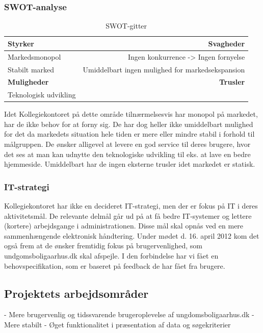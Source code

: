 \documentclass[12pt, a4paper]{report}
\begin{document}
\subsubsection{SWOT-analyse}
\begin{table}[ht]
\caption{SWOT-gitter}
\begin{tabular}{ | l | r | }
\hline
{\bf Styrker} & {\bf Svagheder} \\ \hline
Markedsmonopol & Ingen konkurrence -> Ingen fornyelse \\
Stabilt marked & Umiddelbart ingen mulighed for markedsekspansion \\ \hline
{\bf Muligheder} & {\bf Trusler} \\ \hline
Teknologisk udvikling & \\
\hline
\end{tabular}
\end{table}

Idet Kollegiekontoret på dette område tilnærmelsesvis har monopol på markedet, har de ikke behov for at forny sig. De har dog heller ikke umiddelbart mulighed for det da markedets situation hele tiden er mere eller mindre stabil i forhold til målgruppen. De ønsker alligevel at levere en god service til deres brugere, hvor det ses at man kan udnytte den teknologiske udvikling til eks. at lave en bedre hjemmeside. Umiddelbart har de ingen eksterne trusler idet markedet er statisk.

  \subsubsection{IT-strategi}
Kollegiekontoret har ikke en decideret IT-strategi, men der er fokus på IT i deres aktivitetsmål. De relevante delmål går ud på at få bedre IT-systemer og lettere (kortere) arbejdsgange i administrationen. Disse mål skal opnås ved en mere sammenhængende elektronisk håndtering. Under mødet d. 16. april 2012 kom det også frem at de ønsker fremtidig fokus på brugervenlighed, som undgomsboligaarhus.dk skal afspejle. I den forbindelse har vi fået en behovspecifikation, som er baseret på feedback de har fået fra brugere.

  \subsection{Projektets arbejdsområder}
- Mere brugervenlig og tidssvarende brugeroplevelse af ungdomsboligaarhus.dk \newline
- Mere stabilt \newline
- Øget funktionalitet i præsentation af data og søgekriterier \newline
\end{document}
